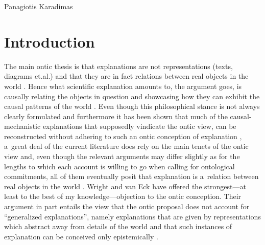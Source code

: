 \begin{artengenv}{Panagiotis Karadimas}
\section{Introduction}
\lettrine[loversize=0.13,lines=2,lraise=-0.03,nindent=0em,findent=0.2pt]%
{T}{}he main ontic thesis is that explanations are not representations (texts, diagrams et.al.) and that they are in fact relations between real objects in the world
\parencites[][]{glennan_modeling_2005}[][]{craver_explaining_2007}. %
 Hence what scientific explanation amounts to, the argument goes, is causally relating the objects in question and showcasing how they can exhibit the causal patterns of the world 
\parencites[][]{salmon_scientific_1984}[][]{salmon_four_1989}[][]{salmon_causality_1998}. %
 Even though this philosophical stance is not always clearly formulated 
\parencite[][]{wright_ontic_2015} %
 and furthermore it has been shown that much of the causal-mechanistic explanations that supposedly vindicate the ontic view, can be reconstructed without adhering to such an ontic conception of explanation 
\parencite[][]{wright_mechanistic_2012}, %
 a~great deal of the current literature does rely on the main tenets of the ontic view and, even though the relevant arguments may differ slightly as for the lengths to which each account is willing to go when calling for ontological commitments, all of them eventually posit that explanation is a~relation between real objects in the world 
\parencites[][]{machamer_thinking_2000}[][]{craver_beyond_2005}[][]{sarkar_mechaninsm_2006}[][]{winning_mechanistic_2020}. %
 Wright and van Eck have offered the strongest---at least to the best of my knowledge---objection to the ontic conception. Their argument in part entails the view that the ontic proposal does not account for ``generalized explanations'', namely explanations that are given by representations which abstract away from details of the world and that such instances of explanation can be conceived only epistemically 
\parencite[][p.1019]{wright_ontic_2018}.%



\end{artengenv}

